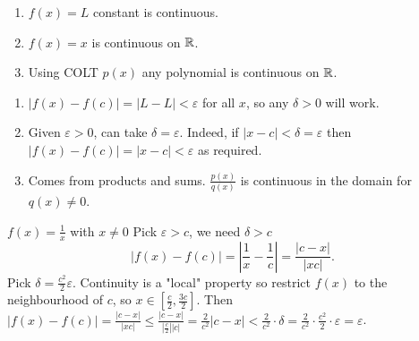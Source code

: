 \documentclass[10pt, a4paper]{article}
\begin{document}
\begin{example}
    \begin{enumerate}[label = (\roman*)]
        \item $f(x) = L$ constant is continuous.

        \item $f(x) = x$ is continuous on $\mathbb{R}$.

        \item Using COLT $p(x)$ any polynomial is continuous on $\mathbb{R}$.
    \end{enumerate}
    \begin{solution}
        \begin{enumerate}[label = (\roman*)]
            \item $|f(x) - f(c)| = |L - L| < \varepsilon$ for all $x$,
            so any $\delta > 0$ will work.

            \item Given $\varepsilon > 0$,
            can take $\delta = \varepsilon$.
            Indeed,
            if $|x - c| < \delta = \varepsilon$ then $|f(x) - f(c)| = |x - c| < \varepsilon$ as required.

            \item Comes from products and sums.
            $\frac{p(x)}{q(x)}$ is continuous in the domain for $q(x) \neq 0$.
        \end{enumerate}
    \end{solution}
\end{example}

\begin{example}
    $f(x) = \frac{1}{x}$ with $x \neq 0$
    Pick $\varepsilon > c$,
    we need $\delta > c$
    \[
    |f(x) - f(c)| = \left|\frac{1}{x} - \frac{1}{c}\right| = \frac{|c - x|}{|xc|}.
    \]
    Pick $\delta = \frac{c ^ 2}{2}\varepsilon$.
    Continuity is a "local" property so restrict $f(x)$ to the neighbourhood of $c$,
    so $x \in \left[\frac{c}{2}, \frac{3c}{2}\right]$.
    Then $|f(x) - f(c)| = \frac{|c - x|}{|xc|} \leq \frac{|c - x|}{\left|\frac{c}{2}\right||c|} = \frac{2}{c ^ 2}|c - x| < \frac{2}{c ^ 2} \cdot \delta = \frac{2}{c ^ 2} \cdot \frac{c ^ 2}{2} \cdot \varepsilon = \varepsilon$.
\end{example}
\end{document}
